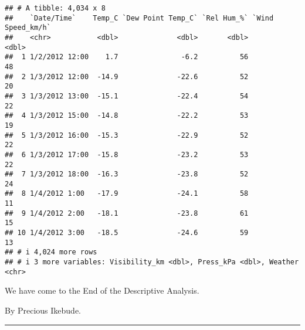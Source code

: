 \documentclass[
]{article}
\begin{document}
\begin{verbatim}
## # A tibble: 4,034 x 8
##    `Date/Time`    Temp_C `Dew Point Temp_C` `Rel Hum_%` `Wind Speed_km/h`
##    <chr>           <dbl>              <dbl>       <dbl>             <dbl>
##  1 1/2/2012 12:00    1.7               -6.2          56                48
##  2 1/3/2012 12:00  -14.9              -22.6          52                20
##  3 1/3/2012 13:00  -15.1              -22.4          54                22
##  4 1/3/2012 15:00  -14.8              -22.2          53                19
##  5 1/3/2012 16:00  -15.3              -22.9          52                22
##  6 1/3/2012 17:00  -15.8              -23.2          53                22
##  7 1/3/2012 18:00  -16.3              -23.8          52                24
##  8 1/4/2012 1:00   -17.9              -24.1          58                11
##  9 1/4/2012 2:00   -18.1              -23.8          61                15
## 10 1/4/2012 3:00   -18.5              -24.6          59                13
## # i 4,024 more rows
## # i 3 more variables: Visibility_km <dbl>, Press_kPa <dbl>, Weather <chr>
\end{verbatim}

We have come to the End of the Descriptive Analysis.

By Precious Ikebude.

\begin{center}\rule{0.5\linewidth}{0.5pt}\end{center}
\end{document}
